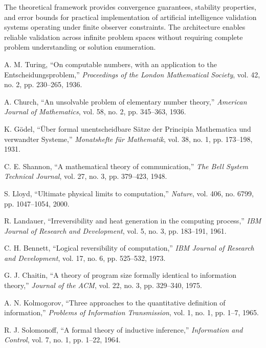 \documentclass[12pt,a4paper]{article}
\begin{document}
The theoretical framework provides convergence guarantees, stability properties, and error bounds for practical implementation of artificial intelligence validation systems operating under finite observer constraints. The architecture enables reliable validation across infinite problem spaces without requiring complete problem understanding or solution enumeration.

\begin{thebibliography}{99}

 A. M. Turing, ``On computable numbers, with an application to the Entscheidungsproblem,'' \textit{Proceedings of the London Mathematical Society}, vol. 42, no. 2, pp. 230--265, 1936.

 A. Church, ``An unsolvable problem of elementary number theory,'' \textit{American Journal of Mathematics}, vol. 58, no. 2, pp. 345--363, 1936.

 K. Gödel, ``Über formal unentscheidbare Sätze der Principia Mathematica und verwandter Systeme,'' \textit{Monatshefte für Mathematik}, vol. 38, no. 1, pp. 173--198, 1931.

 C. E. Shannon, ``A mathematical theory of communication,'' \textit{The Bell System Technical Journal}, vol. 27, no. 3, pp. 379--423, 1948.

 S. Lloyd, ``Ultimate physical limits to computation,'' \textit{Nature}, vol. 406, no. 6799, pp. 1047--1054, 2000.

 R. Landauer, ``Irreversibility and heat generation in the computing process,'' \textit{IBM Journal of Research and Development}, vol. 5, no. 3, pp. 183--191, 1961.

 C. H. Bennett, ``Logical reversibility of computation,'' \textit{IBM Journal of Research and Development}, vol. 17, no. 6, pp. 525--532, 1973.

 G. J. Chaitin, ``A theory of program size formally identical to information theory,'' \textit{Journal of the ACM}, vol. 22, no. 3, pp. 329--340, 1975.

 A. N. Kolmogorov, ``Three approaches to the quantitative definition of information,'' \textit{Problems of Information Transmission}, vol. 1, no. 1, pp. 1--7, 1965.

 R. J. Solomonoff, ``A formal theory of inductive inference,'' \textit{Information and Control}, vol. 7, no. 1, pp. 1--22, 1964.

\end{thebibliography}
\end{document}
